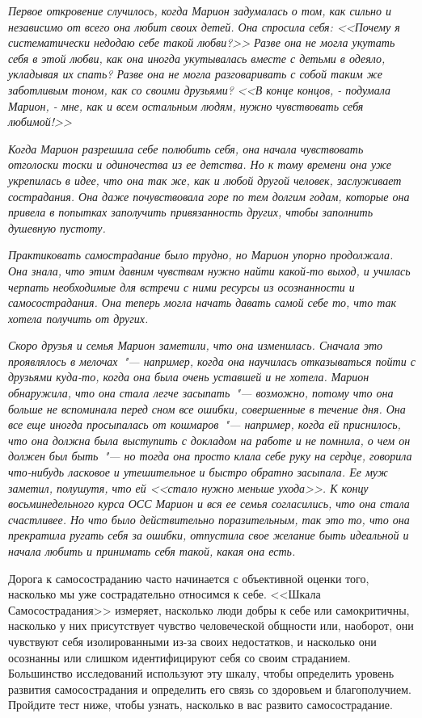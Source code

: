 \textit{Первое откровение случилось, когда Марион задумалась о том, как сильно и независимо от всего она любит своих детей. Она спросила себя: <<Почему я систематически недодаю себе такой любви?>> Разве она не могла укутать себя в этой любви, как она иногда укутывалась вместе с детьми в одеяло, укладывая их спать? Разве она не могла разговаривать с собой таким же заботливым тоном, как со своими друзьями? <<В конце концов, - подумала Марион, - мне, как и всем остальным людям, нужно чувствовать себя любимой!>>}

\textit{Когда Марион разрешила себе полюбить себя, она начала чувствовать отголоски тоски и одиночества из ее детства. Но к тому времени она уже укрепилась в идее, что она так же, как и любой другой человек, заслуживает сострадания. Она даже почувствовала горе по тем долгим годам, которые она привела в попытках заполучить привязанность других, чтобы заполнить душевную пустоту.}

\textit{Практиковать самострадание было трудно, но Марион упорно продолжала. Она знала, что этим давним чувствам нужно найти какой-то выход, и училась черпать необходимые для встречи с ними ресурсы из осознанности и самосострадания. Она теперь могла начать давать самой себе то, что так хотела получить от других.}

\textit{Скоро друзья и семья Марион заметили, что она изменилась. Сначала это проявлялось в мелочах~"--- например, когда она научилась отказываться пойти с друзьями куда-то, когда она была очень уставшей и не хотела. Марион обнаружила, что она стала легче засыпать~"--- возможно, потому что она больше не вспоминала перед сном все ошибки, совершенные в течение дня. Она все еще иногда просыпалась от кошмаров~"--- например, когда ей приснилось, что она должна была выступить с докладом на работе и не помнила, о чем он должен был быть~"--- но тогда она просто клала себе руку на сердце, говорила что-нибудь ласковое и утешительное и быстро обратно засыпала. Ее муж заметил, полушутя, что ей <<стало нужно меньше ухода>>. К концу восьминедельного курса ОСС Марион и вся ее семья согласились, что она стала счастливее. Но что было действительно поразительным, так это то, что она прекратила ругать себя за ошибки, отпустила свое желание быть идеальной и начала любить и принимать себя такой, какая она есть.}


Дорога к самосостраданию часто начинается с объективной оценки того, насколько мы уже сострадательно относимся к себе. <<Шкала Самосострадания>> измеряет, насколько люди добры к себе или самокритичны, насколько у них присутствует чувство человеческой общности или, наоборот, они чувствуют себя изолированными из-за своих недостатков, и насколько они осознанны или слишком идентифицируют себя со своим страданием. Большинство исследований используют эту шкалу, чтобы определить уровень развития самосострадания и определить его связь со здоровьем и благополучием. Пройдите тест ниже, чтобы узнать, насколько в вас развито самосострадание. 

